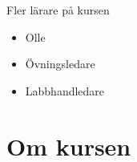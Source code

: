 \begin{frame}
  \begin{block}{Fler lärare på kursen}
    \begin{itemize}
      \item Olle
      \item Övningsledare
      \item Labbhandledare
    \end{itemize}
  \end{block}
\end{frame}

%
%


%


\section{Om kursen}

